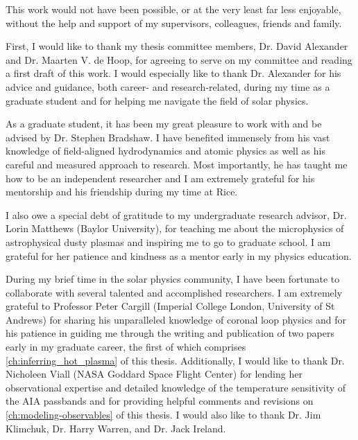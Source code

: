 
\begin{acknowledgements}      

This work would not have been possible, or at the very least far less enjoyable, without the help and support of my supervisors, colleagues, friends and family. 

First, I would like to thank my thesis committee members, Dr. David Alexander and Dr. Maarten V. de Hoop, for agreeing to serve on my committee and reading a first draft of this work. I would especially like to thank Dr. Alexander for his advice and guidance, both career- and research-related, during my time as a graduate student and for helping me navigate the field of solar physics.

As a graduate student, it has been my great pleasure to work with and be advised by Dr. Stephen Bradshaw. I have benefited immensely from his vast knowledge of field-aligned hydrodynamics and atomic physics as well as his careful and measured approach to research. Most importantly, he has taught me how to be an independent researcher and I am extremely grateful for his mentorship and his friendship during my time at Rice.

I also owe a special debt of gratitude to my undergraduate research advisor, Dr. Lorin Matthews (Baylor University), for teaching me about the microphysics of astrophysical dusty plasmas and inspiring me to go to graduate school. I am grateful for her patience and kindness as a mentor early in my physics education.

During my brief time in the solar physics community, I have been fortunate to collaborate with several talented and accomplished researchers. I am extremely grateful to Professor Peter Cargill (Imperial College London, University of St Andrews) for sharing his unparalleled knowledge of coronal loop physics and for his patience in guiding me through the writing and publication of two papers early in my graduate career, the first of which comprises \autoref{ch:inferring_hot_plasma} of this thesis. Additionally, I would like to thank Dr. Nicholeen Viall (NASA Goddard Space Flight Center) for lending her observational expertise and detailed knowledge of the temperature sensitivity of the AIA passbands and for providing helpful comments and revisions on \autoref{ch:modeling-observables} of this thesis. I would also like to thank Dr. Jim Klimchuk, Dr. Harry Warren, and Dr. Jack Ireland.


\end{acknowledgements}
